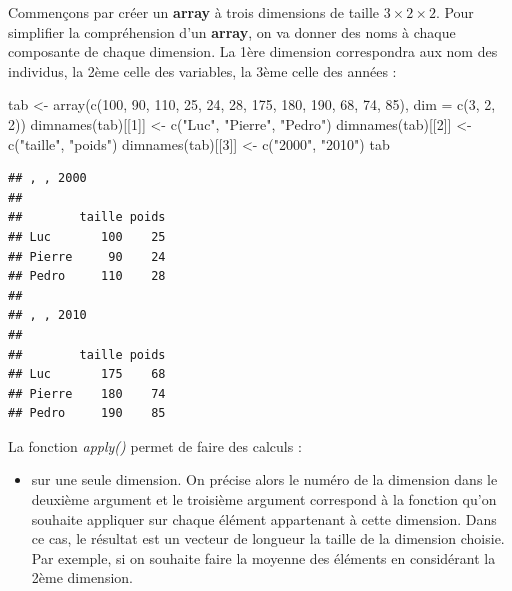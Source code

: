 \documentclass[
]{book}
\newenvironment{Shaded}{\begin{snugshade}}{\end{snugshade}}
\newcommand{\AttributeTok}[1]{\textcolor[rgb]{0.77,0.63,0.00}{#1}}
\newcommand{\DecValTok}[1]{\textcolor[rgb]{0.00,0.00,0.81}{#1}}
\newcommand{\FunctionTok}[1]{\textcolor[rgb]{0.00,0.00,0.00}{#1}}
\newcommand{\NormalTok}[1]{#1}
\newcommand{\OtherTok}[1]{\textcolor[rgb]{0.56,0.35,0.01}{#1}}
\newcommand{\StringTok}[1]{\textcolor[rgb]{0.31,0.60,0.02}{#1}}
\providecommand{\tightlist}{%
  \setlength{\itemsep}{0pt}\setlength{\parskip}{0pt}}
\theoremstyle{definition}
\theoremstyle{definition}
\theoremstyle{definition}
\theoremstyle{definition}
\theoremstyle{remark}
\begin{document}
Commençons par créer un \textbf{array} à trois dimensions de taille \(3 \times 2 \times 2\). Pour simplifier la compréhension d'un \textbf{array}, on va donner des noms à chaque composante de chaque dimension. La 1ère dimension correspondra aux nom des individus, la 2ème celle des variables, la 3ème celle des années :

\begin{Shaded}
\begin{Highlighting}[]
\NormalTok{tab }\OtherTok{\textless{}{-}} \FunctionTok{array}\NormalTok{(}\FunctionTok{c}\NormalTok{(}\DecValTok{100}\NormalTok{, }\DecValTok{90}\NormalTok{, }\DecValTok{110}\NormalTok{, }\DecValTok{25}\NormalTok{, }\DecValTok{24}\NormalTok{, }\DecValTok{28}\NormalTok{, }\DecValTok{175}\NormalTok{, }\DecValTok{180}\NormalTok{, }\DecValTok{190}\NormalTok{, }\DecValTok{68}\NormalTok{, }\DecValTok{74}\NormalTok{, }\DecValTok{85}\NormalTok{), }
             \AttributeTok{dim =} \FunctionTok{c}\NormalTok{(}\DecValTok{3}\NormalTok{, }\DecValTok{2}\NormalTok{, }\DecValTok{2}\NormalTok{))}
\FunctionTok{dimnames}\NormalTok{(tab)[[}\DecValTok{1}\NormalTok{]] }\OtherTok{\textless{}{-}} \FunctionTok{c}\NormalTok{(}\StringTok{"Luc"}\NormalTok{, }\StringTok{"Pierre"}\NormalTok{, }\StringTok{"Pedro"}\NormalTok{)}
\FunctionTok{dimnames}\NormalTok{(tab)[[}\DecValTok{2}\NormalTok{]] }\OtherTok{\textless{}{-}} \FunctionTok{c}\NormalTok{(}\StringTok{"taille"}\NormalTok{, }\StringTok{"poids"}\NormalTok{)}
\FunctionTok{dimnames}\NormalTok{(tab)[[}\DecValTok{3}\NormalTok{]] }\OtherTok{\textless{}{-}} \FunctionTok{c}\NormalTok{(}\StringTok{"2000"}\NormalTok{, }\StringTok{"2010"}\NormalTok{)}
\NormalTok{tab}
\end{Highlighting}
\end{Shaded}

\begin{verbatim}
## , , 2000
## 
##        taille poids
## Luc       100    25
## Pierre     90    24
## Pedro     110    28
## 
## , , 2010
## 
##        taille poids
## Luc       175    68
## Pierre    180    74
## Pedro     190    85
\end{verbatim}

La fonction \emph{apply()} permet de faire des calculs :

\begin{itemize}
\tightlist
\item
  sur une seule dimension. On précise alors le numéro de la dimension dans le deuxième argument et le troisième argument correspond à la fonction qu'on souhaite appliquer sur chaque élément appartenant à cette dimension. Dans ce cas, le résultat est un vecteur de longueur la taille de la dimension choisie. Par exemple, si on souhaite faire la moyenne des éléments en considérant la 2ème dimension.
\end{itemize}
\end{document}
